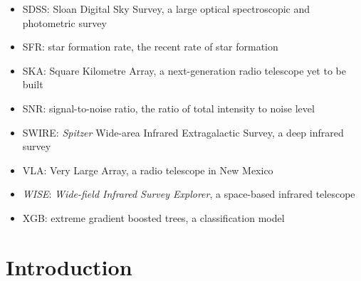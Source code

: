 \documentclass[11pt, a4paper]{book}
\begin{document}
\begin{itemize}
    \item SDSS: Sloan Digital Sky Survey, a large optical spectroscopic and photometric survey
    \item SFR: star formation rate, the recent rate of star formation
    \item SKA: Square Kilometre Array, a next-generation radio telescope yet to be built
    \item SNR: signal-to-noise ratio, the ratio of total intensity to noise level
    \item SWIRE: \emph{Spitzer} Wide-area Infrared Extragalactic Survey, a deep infrared survey
    \item VLA: Very Large Array, a radio telescope in New Mexico
    \item \emph{WISE}: \emph{Wide-field Infrared Survey Explorer}, a space-based infrared telescope
    \item XGB: extreme gradient boosted trees, a classification model
\end{itemize}

\mainmatter

\chapter{Introduction}
\label{cha:intro}


\end{document}
